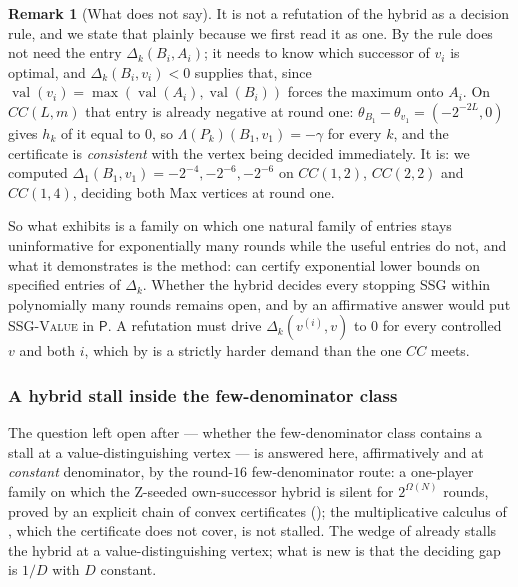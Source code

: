 \documentclass[11pt]{article}
\theoremstyle{plain}
\theoremstyle{definition}
\newtheorem{remark}[theorem]{Remark}
\DeclareMathOperator{\val}{val}
\begin{document}
\begin{remark}[What  does not say]\label{rem:hybrid-lower-not-a-refutation}
It is not a refutation of the hybrid as a decision rule, and we state that
plainly because we first read it as one. By  the rule
does not need the entry $\Delta_k(B_i,A_i)$; it needs to know which successor of
$v_i$ is optimal, and $\Delta_k(B_i,v_i)<0$ supplies that, since
$\val(v_i)=\max(\val(A_i),\val(B_i))$ forces the maximum onto $A_i$. On
$CC(L,m)$ that entry is already negative at round one:
$\theta_{B_1}-\theta_{v_1}=(-2^{-2L},0)$ gives $h_k$ of it equal to $0$, so
$\Lambda(P_k)(B_1,v_1)=-\gamma$ for every $k$, and the certificate is
\emph{consistent} with the vertex being decided immediately. It is: we computed
$\Delta_1(B_1,v_1)=-2^{-4},-2^{-6},-2^{-6}$ on $CC(1,2)$, $CC(2,2)$ and
$CC(1,4)$, deciding both Max vertices at round one.

So what  exhibits is a family on which one natural
family of entries stays uninformative for exponentially many rounds while the
useful entries do not, and what it demonstrates is the method:
 can certify exponential lower bounds on
specified entries of $\Delta_k$. Whether the hybrid decides every stopping SSG
within polynomially many rounds remains open, and by
 an affirmative answer would put \textsc{SSG-Value} in
$\mathsf P$. A refutation must drive $\Delta_k(v^{(i)},v)$ to $0$ for every
controlled $v$ and both $i$, which by  is a strictly
harder demand than the one $CC$ meets.
\end{remark}

\subsubsection*{A hybrid stall inside the few-denominator class}

The question left open after  --- whether the
few-denominator class contains a stall at a value-distinguishing vertex
--- is answered here, affirmatively and at \emph{constant} denominator,
by the round-$16$ few-denominator route: a one-player family on which
the Z-seeded own-successor hybrid is silent for $2^{\Omega(N)}$ rounds,
proved by an explicit chain of convex certificates
(); the multiplicative calculus of
, which the certificate does not cover, is not stalled.
The wedge of  already
stalls the hybrid at a value-distinguishing vertex; what is new is that
the deciding gap is $1/D$ with $D$ constant.
\end{document}
